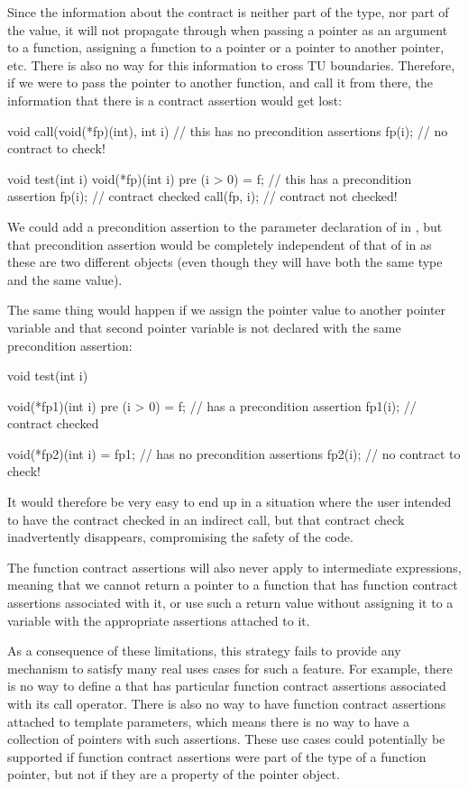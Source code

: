Since the information about the contract is neither part of the type, nor part of the value, it will not propagate through when passing a pointer as an argument to a function, assigning a function to a pointer or a pointer to another pointer, etc. There is also no way for this information to cross TU boundaries. Therefore, if we were to pass the pointer  to another function, and call it from there, the information that there is a contract assertion would get lost:
\begin{codeblock}
void call(void(*fp)(int), int i) {    // this  has no precondition assertions
  fp(i);       // no contract to check!
}

void test(int i) {
  void(*fp)(int i) pre (i > 0) = f;   // this  has a precondition assertion
  fp(i);       // contract  checked
  call(fp, i); // contract  not checked!
}
\end{codeblock}
We could add a precondition assertion to the parameter declaration of  in , but that precondition assertion would be completely independent of that of  in  as these are two different objects (even though they will have both the same type and the same value).

The same thing would happen if we assign the pointer value to another pointer variable and that second pointer variable is not declared with the same precondition assertion:
\begin{codeblock}
void test(int i) {
  void(*fp1)(int i) pre (i > 0) = f;   //  has a precondition assertion
  fp1(i);   // contract  checked
  
  void(*fp2)(int i) = fp1;             //  has no precondition assertions
  fp2(i);  // no contract to check!
}
\end{codeblock}
It would therefore be very easy to end up in a situation where the user intended to have the contract checked in an indirect call, but that contract check inadvertently disappears, compromising the safety of the code.

The function contract assertions will also never apply to intermediate expressions, meaning that we cannot return a pointer to a function that has function contract assertions associated with it, or use such a return value without assigning it to a variable with the appropriate assertions attached to it.

As a consequence of these limitations, this strategy fails to provide any mechanism to satisfy many real uses cases for such a feature. For example, there is no way to define a  that has particular function contract assertions associated with its call operator. There is also no way to have function contract assertions attached to template parameters, which means there is no way to have a collection of pointers with such assertions. These use cases could potentially be supported if function contract assertions were part of the type of a function pointer, but not if they are a property of the pointer object.

